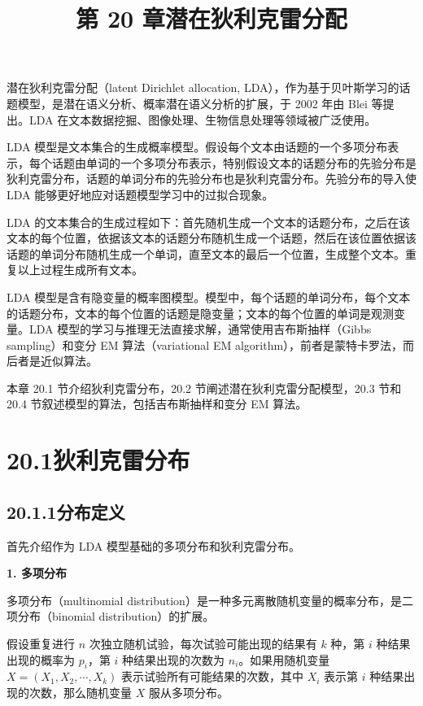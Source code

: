 \documentclass[UTF8,12pt,a4paper,fontset=fandol]{ctexart}
\title{第 20 章\quad 潜在狄利克雷分配}
\author{}
\date{}
\begin{document}
\maketitle

潜在狄利克雷分配（latent Dirichlet allocation, LDA），作为基于贝叶斯学习的话题模型，是潜在语义分析、概率潜在语义分析的扩展，于 2002 年由 Blei 等提出。LDA 在文本数据挖掘、图像处理、生物信息处理等领域被广泛使用。

LDA 模型是文本集合的生成概率模型。假设每个文本由话题的一个多项分布表示，每个话题由单词的一个多项分布表示，特别假设文本的话题分布的先验分布是狄利克雷分布，话题的单词分布的先验分布也是狄利克雷分布。先验分布的导入使 LDA 能够更好地应对话题模型学习中的过拟合现象。

LDA 的文本集合的生成过程如下：首先随机生成一个文本的话题分布，之后在该文本的每个位置，依据该文本的话题分布随机生成一个话题，然后在该位置依据该话题的单词分布随机生成一个单词，直至文本的最后一个位置，生成整个文本。重复以上过程生成所有文本。

LDA 模型是含有隐变量的概率图模型。模型中，每个话题的单词分布，每个文本的话题分布，文本的每个位置的话题是隐变量；文本的每个位置的单词是观测变量。LDA 模型的学习与推理无法直接求解，通常使用吉布斯抽样（Gibbs sampling）和变分 EM 算法（variational EM algorithm），前者是蒙特卡罗法，而后者是近似算法。

本章 20.1 节介绍狄利克雷分布，20.2 节阐述潜在狄利克雷分配模型，20.3 节和 20.4 节叙述模型的算法，包括吉布斯抽样和变分 EM 算法。

\section*{20.1\quad 狄利克雷分布}

\subsection*{20.1.1\quad 分布定义}

首先介绍作为 LDA 模型基础的多项分布和狄利克雷分布。

\noindent\textbf{1. 多项分布}

多项分布（multinomial distribution）是一种多元离散随机变量的概率分布，是二项分布（binomial distribution）的扩展。

假设重复进行 $n$ 次独立随机试验，每次试验可能出现的结果有 $k$ 种，第 $i$ 种结果出现的概率为 $p_i$，第 $i$ 种结果出现的次数为 $n_i$。如果用随机变量 $X=(X_1,X_2,\cdots,X_k)$ 表示试验所有可能结果的次数，其中 $X_i$ 表示第 $i$ 种结果出现的次数，那么随机变量 $X$ 服从多项分布。
\end{document}
